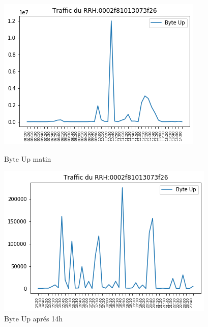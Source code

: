 \documentclass{report}
\begin{document}
\begin{figure}[!htb]
   \begin{minipage}{0.48\textwidth}
     \centering
     \includegraphics[scale=0.5]{images/byteUp1.png}
     \caption{Byte Up matin}\label{Fig:Data1}
   \end{minipage}\hfill
   \begin{minipage}{0.48\textwidth}
     \centering
     \includegraphics[scale=0.5]{images/byteUp2.png}
     \caption{Byte Up aprés 14h }\label{Fig:Data2}
   \end{minipage}
\end{figure} 
\end{document}
